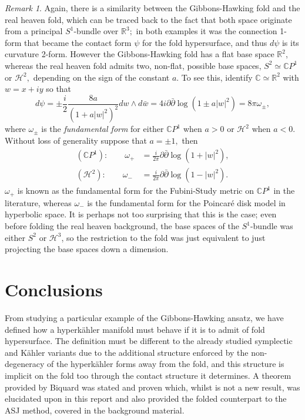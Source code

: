 \documentclass[a4paper,12pt, onecolumn, notitlepage]{article}
\theoremstyle{definition}
\theoremstyle{remark}
\newtheorem{rmk}[thm]{Remark}
\newcommand{\w}{\omega}
\newcommand{\K}{K\"ahler }
\newcommand{\HK}{hyperk\"ahler }
\newcommand{\R}{\mathbb{R}}
\begin{document}
\begin{rmk}
	Again, there is a similarity between the Gibbons-Hawking fold and the real heaven fold, which can be traced back to the fact that both space originate from a principal $S^{1}$-bundle over $\R^{3};$ in both examples it was the connection 1-form that became the contact form $\psi$ for the fold hypersurface, and thus $d\psi$ is its curvature 2-form. However the Gibbons-Hawking fold has a flat base space $\mathbb{R}^{2}$, whereas the real heaven fold admits two, non-flat, possible base spaces, $S^{2}\simeq \mathbb{C}P^{1}$ or $\mathcal{H}^{2},$ depending on the sign of the constant $a.$ To see this, identify $\mathbb{C}\simeq\mathbb{R}^{2}$ with $w=x+iy$ so that
	\begin{equation}
		d\psi=\pm\frac{i}{2}\frac{8a}{(1+a|w|^{2})^{2}}dw\wedge d\bar{w} = 4i\partial\bar{\partial}\log(1\pm a|w|^{2}) = 8\pi\w_{\pm},
	\end{equation}
	where $\w_{\pm}$ is the \emph{fundamental form} for either $\mathbb{C}P^{1}$ when $a>0$ or $\mathcal{H}^{2}$ when $a<0.$ Without loss of generality suppose that $a = \pm 1,$ then
	\begin{subequations}
		\begin{align}
		\label{fubini}
		(\mathbb{C}P^{1}):\qquad \w_{+} &= \frac{i}{2\pi}\partial\bar{\partial}\log(1+|w|^{2}),\\
		\label{poincare}
		(\mathcal{H}^{2}):\qquad \w_{-} &= \frac{i}{2\pi}\partial\bar{\partial}\log(1-|w|^{2}).
		\end{align} 
	\end{subequations}
	$\w_{+}$ is known as the fundamental form for the Fubini-Study metric on $\mathbb{C}P^{1}$ in the literature, whereas $\w_{-}$ is the fundamental form for the Poincar\'{e} disk model in hyperbolic space. It is perhaps not too surprising that this is the case; even before folding the real heaven background, the base spaces of the $S^{1}$-bundle was either $S^{2}$ or $\mathcal{H}^{3}$, so the restriction to the fold was just equivalent to just projecting the base spaces down a dimension.
\end{rmk}
\section{Conclusions}
From studying a particular example of the Gibbons-Hawking ansatz, we have defined how a \HK manifold must behave if it is to admit of fold hypersurface. The definition must be different to the already studied symplectic and \K variants due to the additional structure enforced by the non-degeneracy of the \HK forms away from the fold, and this structure is implicit on the fold too through the contact structure it determines. A theorem provided by Biquard \cite{biquard_2015} was stated and proven which, whilst is not a new result, was elucidated upon in this report and also provided the folded counterpart to the ASJ method, covered in the background material.\\
\end{document}
